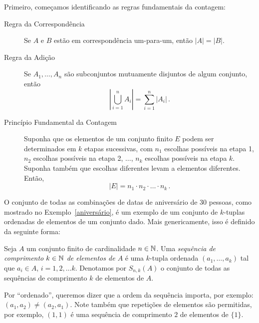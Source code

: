 Primeiro, começamos identificando as regras fundamentais da contagem:
\begin{description}
\item[Regra da Correspondência] Se $A$ e $B$ estão em correspondência um-para-um, então $|A|= |B|$.
\item[Regra da Adição] Se $A_1, \dots, A_n$ são subconjuntos mutuamente disjuntos de algum conjunto, então
\begin{equation}
\left| \bigcup_{i=1}^{n}A_i \right| = \sum_{i=1}^{n}|A_i| \,.
\end{equation} 
\item[Princípio Fundamental da Contagem]
Suponha que os elementos de um conjunto finito $E$ podem ser determinados em $k$ etapas sucessivas, com $n_1$ escolhas possíveis na etapa 1, $n_2$ escolhas possíveis na etapa 2, $\dots$, $n_k$ escolhas possíveis na etapa $k$. Suponha também que escolhas diferentes levam a elementos diferentes. Então,
\begin{equation}
|E|= n_1 \cdot n_2 \cdot \dots \cdot n_k \,.
\end{equation}
\end{description}

O conjunto de todas as combinações de datas de aniversário de 30 pessoas, como mostrado no Exemplo~\ref{aniversário}, é um exemplo de um conjunto de $k$-tuplas ordenadas de elementos de um conjunto dado. Mais genericamente, isso é definido da seguinte forma:

\begin{definition}
Seja $A$ um conjunto finito de cardinalidade $n \in \mathbb{N}$. Uma \emph{sequência de comprimento $k \in \mathbb{N}$ de elementos de $A$} é uma $k$-tupla ordenada $(a_1,\dots,a_k)$ tal que $a_i \in A$, $i=1,2, \dots k$. Denotamos por $S_{n,k}(A)$ o conjunto de todas as sequências de comprimento $k$ de elementos de $A$. \label{def_seq}
\end{definition}

Por ``ordenado'', queremos dizer que a ordem da sequência importa, por exemplo: $(a_1,a_2) \neq (a_2,a_1)$. Note também que repetições de elementos são permitidas, por exemplo, $(1,1)$ é uma sequência de comprimento $2$ de elementos de $\{1\}$.

